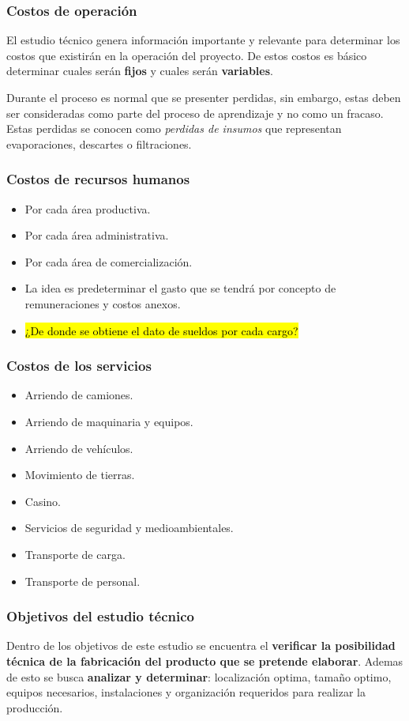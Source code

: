 \documentclass{templateNote}
\begin{document}
\subsubsection{Costos de operación}
El estudio técnico genera información importante y relevante para determinar los costos que existirán en la operación del proyecto. De estos costos es básico determinar cuales serán \textbf{fijos} y cuales serán \textbf{variables}.

Durante el proceso es normal que se presenter perdidas, sin embargo, estas deben ser consideradas como parte del proceso de aprendizaje y no como un fracaso. Estas perdidas se conocen como \textit{perdidas de insumos} que representan evaporaciones, descartes o filtraciones.

\subsubsection*{Costos de recursos humanos}
\begin{itemize}
    \item Por cada área productiva.
    \item Por cada área administrativa.
    \item Por cada área de comercialización.
    \item La idea es predeterminar el gasto que se tendrá por concepto de remuneraciones y costos anexos.
    \item \hl{¿De donde se obtiene el dato de sueldos por cada cargo?} 
\end{itemize}
\subsubsection*{Costos de los servicios}
\begin{itemize}
    \item Arriendo de camiones.
    \item Arriendo de maquinaria y equipos.
    \item Arriendo de vehículos.
    \item Movimiento de tierras.
    \item Casino.
    \item Servicios de seguridad y medioambientales.
    \item Transporte de carga.
    \item Transporte de personal.
\end{itemize}

\subsubsection{Objetivos del estudio técnico}
Dentro de los objetivos de este estudio se encuentra el \textbf{verificar la posibilidad técnica de la fabricación del producto que se pretende elaborar}. 
Ademas de esto se busca \textbf{analizar y determinar}: localización optima, tamaño optimo, equipos necesarios, instalaciones y organización requeridos para realizar la producción. 
\end{document}
